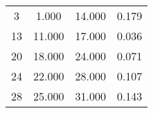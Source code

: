 % 
\begin{tabular}{cccc}
  \hline
  \hline
3 & 1.000 & 14.000 & 0.179 \\ 
  13 & 11.000 & 17.000 & 0.036 \\ 
  20 & 18.000 & 24.000 & 0.071 \\ 
  24 & 22.000 & 28.000 & 0.107 \\ 
  28 & 25.000 & 31.000 & 0.143 \\ 
   \hline
\end{tabular}
